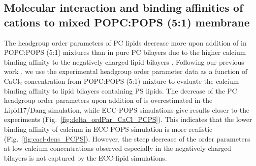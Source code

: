 \documentclass[journal=jpcbfk,manuscript=article]{achemso}
\begin{document}



\subsection{Molecular interaction and binding affinities of  cations to mixed POPC:POPS (5:1) membrane} 
\label{section:lip-ion_ca}

The headgroup order parameters of PC lipids decrease more upon addition of 
in POPC:POPS (5:1) mixtures than in pure PC bilayers due to the higher calcium binding
affinity to the negatively charged lipid bilayers \cite{akutsu81,altenbach84,roux90,nmrlipids_proj4}.
Following our previous work \cite{nmrlipids_proj4}, we use the experimental
headgroup order parameter data as a function of CaCl$_2$ concentration
from POPC:POPS (5:1) mixture to evaluate the calcium binding affinity to lipid bilayers containing PS lipids.
The decrease of the PC headgroup order parameters upon addition of  
is overestimated in the Lipid17/Dang simulation, while ECC-POPS simulations give results
closer to the experiments (Fig.~\ref{fig:delta_ordPar_CaCl_PCPS}). 
This indicates that the lower binding affinity of calcium in ECC-POPS
simulation is more realistic (Fig.~\ref{fig:cacl-dens_PCPS}).
However, the steep decrease of the order parameters at low calcium concentrations
observed especially in the negatively charged bilayers is not captured by the ECC-lipid simulations.
\end{document}
